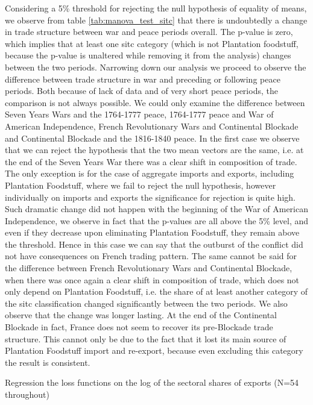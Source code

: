 \documentclass[12pt,a4paper,notitlepage,english]{article}
\begin{document}
Considering a 5\% threshold for rejecting the null hypothesis of equality of means, we observe from table \ref{tab:manova_test_sitc} that there is undoubtedly a change in trade structure between war and peace periods overall. The p-value is zero, which implies that at least one sitc category (which is not Plantation foodstuff, because the p-value is unaltered while removing it from the analysis) changes between the two periods. Narrowing down our analysis we proceed to observe the difference between trade structure in war and preceding or following peace periods. Both because of lack of data and of very short peace periods, the comparison is not always possible. We could only examine the difference between Seven Years Wars and the 1764-1777 peace, 1764-1777 peace and War of American Independence, French Revolutionary Wars and Continental Blockade and Continental Blockade and the 1816-1840 peace. In the first case we observe that we can reject the hypothesis that the two mean vectors are the same, i.e. at the end of the Seven Years War there was a clear shift in composition of trade. The only exception is for the case of aggregate imports and exports, including Plantation Foodstuff, where we fail to reject the null hypothesis, however individually on imports and exports the significance for rejection is quite high. Such dramatic change did not happen with the beginning of the War of American Independence, we observe in fact that the p-values are all above the 5\% level, and even if they decrease upon eliminating Plantation Foodstuff, they remain above the threshold. Hence in this case we can say that the outburst of the conflict did not have consequences on French trading pattern. The same cannot be said for the difference between French Revolutionary Wars and Continental Blockade, when there was once again a clear shift in composition of trade, which does not only depend on Plantation Foodstuff, i.e. the share of at least another category of the sitc classification changed significantly between the two periods. We also observe that the change was longer lasting. At the end of the Continental Blockade in fact, France does not seem to recover its pre-Blockade trade structure. This cannot only be due to the fact that it lost its main source of Plantation Foodstuff import and re-export, because even excluding this category the result is consistent. 

\begin{table}
	\caption{Regression the loss functions on the log of the sectoral shares of exports (N=54 throughout)}
	
\end{table}
\end{document}

